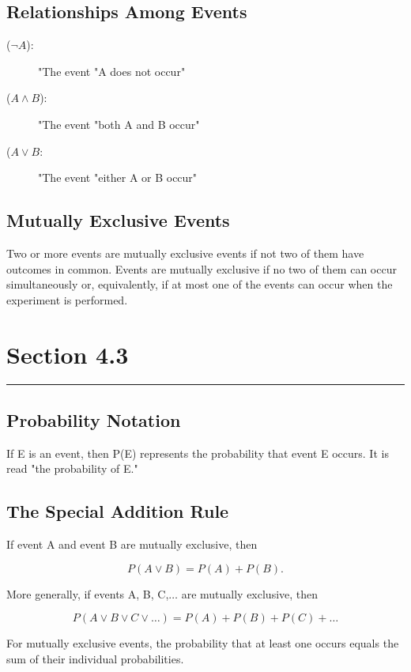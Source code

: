 \documentclass[12pt]{article}
\begin{document}
        \subsection*{Relationships Among Events}
            \begin{description}
                \item[(\(\neg A\)):] "The event "A does not occur"
                \item[(\(A \wedge B\)):] "The event "both A and B occur"
                \item[(\(A \vee B\):] "The event "either A or B occur"
            \end{description}
        \subsection*{Mutually Exclusive Events}
               Two or more events are mutually exclusive events if not two of them have outcomes in
               common.
               Events are mutually exclusive if no two of them can occur simultaneously or,
               equivalently, if at most one of the events can occur when the experiment is performed.

    \section*{Section 4.3}
    \noindent\rule{\textwidth}{0.4pt}
        \subsection*{Probability Notation}
            If E is an event, then P(E) represents the probability that event E occurs. It is read
            "the probability of E."
        \subsection*{The Special Addition Rule}
            If event A and event B are mutually exclusive, then
            \begin{center}
                \[
                    P(A \vee B) = P(A)  + P(B).  
                \]
            \end{center}
            More generally, if events A, B, C,$\dots$ are mutually exclusive, then
            \begin{center}
                \[
                    P(A \vee B \vee C \vee \dots) = P(A) + P(B) + P(C) + \dots    
                \]                
            \end{center}
            For mutually exclusive events, the probability that at least one occurs equals the sum
            of their individual probabilities.
\end{document}
